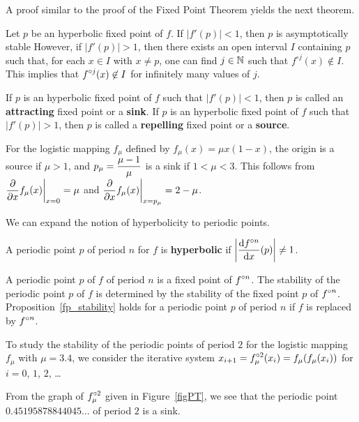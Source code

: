 A proof similar to the proof of the Fixed Point Theorem yields the next
theorem.

\begin{prop}
Let $p$ be an hyperbolic fixed point of $f$.  If
$\left|f'(p)\right|<1$, then $p$ is asymptotically stable
However, if $\left|f'(p)\right|>1$, then there exists an open
interval $I$ containing $p$ such that, for each $x \in I$ with
$x \neq p$, one can find $j \in \NN$ such that $f^{\circ j}(x) \not\in I$.
This implies that $\DS f^{\circ j}(x) \not\in I$ for infinitely many
values of $j$. \label{fp_stability}
\end{prop}

\begin{defn}
If $p$ is an hyperbolic fixed point of $f$ such that
$\left|f'(p)\right|<1$, then $p$ is called an
{\bfseries attracting} fixed point or a
{\bfseries sink}.
If $p$ is an hyperbolic fixed point of $f$ such that
$\left|f'(p)\right|>1$, then $p$ is called a
{\bfseries repelling} fixed point or a
{\bfseries source}.
\end{defn}

\begin{egg}
For the logistic mapping $f_\mu$ defined by $f_\mu(x) = \mu x(1-x)$,
the origin is a source if $\mu>1$, and
$\DS p_\mu  = \frac{\mu-1}{\mu}$ is a sink
if $1<\mu<3$.  This follows from
$\DS \pdfdx{f_\mu(x)}{x}\bigg|_{x=0} = \mu$ and
$\DS \pdfdx{f_\mu(x)}{x}\bigg|_{x=p_\mu} = 2-\mu$.
\label{EggLogMap2}
\end{egg}

We can expand the notion of hyperbolicity to periodic points.

\begin{defn}
A periodic point $p$ of period $n$ for $f$ is
{\bfseries hyperbolic}
if $\DS \left| \dydx{f^{\circ n}}{x}(p) \right| \neq 1$.
\end{defn}

A periodic point $p$ of $f$ of period $n$ is a fixed point of
$\DS f^{\circ n}$.
The stability of the periodic point $p$ of $f$ is determined by the
stability of the fixed point $p$ of $\DS f^{\circ n}$.
Proposition~\ref{fp_stability} holds for a periodic point $p$ of period $n$ if
$f$ is replaced by $\DS f^{\circ n}$.

\begin{egg}
To study the stability of the periodic points of period $2$ for the
logistic mapping $f_\mu$ with $\mu = 3.4$, we consider the iterative system
$\DS x_{i+1} = f_\mu^{\circ 2}(x_i) = f_\mu(f_\mu(x_i))$ for
$i=0$, $1$, $2$, \ldots


From the graph of $\DS f_\mu^{\circ 2}$ given in Figure~\ref{figPT},
we see that the periodic point\\ $0.45195878844045\ldots$ of period
$2$ is a sink.  \label{EggLogMap3}
\end{egg}

